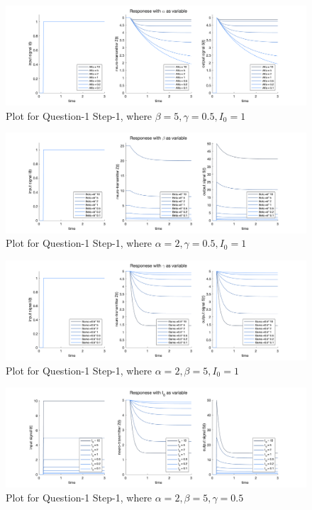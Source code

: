 \begin{figure}
    \centering
    \includegraphics[scale=0.28]{picture/q1-1-1.png}
    \caption{Plot for Question-1 Step-1, where $\beta = 5, \gamma = 0.5, I_0 = 1$}
    \label{fig:my_label1}
\end{figure}
\begin{figure}
    \centering
    \includegraphics[scale=0.28]{picture/q1-1-2.png}
    \caption{Plot for Question-1 Step-1, where $\alpha = 2, \gamma = 0.5, I_0 = 1$}
    \label{fig:my_label2}
\end{figure}
\begin{figure}
    \centering
    \includegraphics[scale=0.28]{picture/q1-1-3.png}
    \caption{Plot for Question-1 Step-1, where $\alpha = 2, \beta = 5, I_0 = 1$}
    \label{fig:my_label3}
\end{figure}
\begin{figure}
    \centering
    \includegraphics[scale=0.28]{picture/q1-1-4.png}
    \caption{Plot for Question-1 Step-1, where $\alpha = 2, \beta = 5, \gamma = 0.5$}
    \label{fig:my_label4}
\end{figure}


